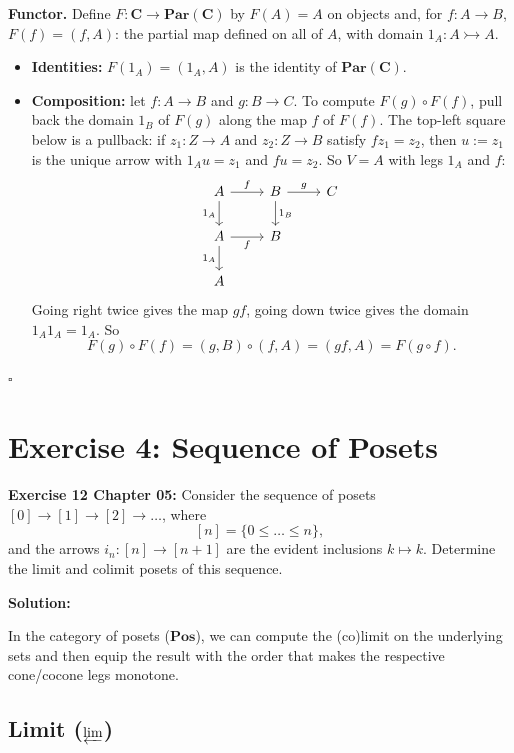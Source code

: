 \documentclass[11pt]{article}
\begin{document}
\textbf{Functor.} Define $F : \mathbf{C} \to \mathbf{Par}(\mathbf{C})$
by $F(A) = A$ on objects and, for $f : A \to B$, $F(f) = (f, A)$: the partial
map defined on all of $A$, with domain $1_A : A \rightarrowtail A$.
\begin{itemize}
  \item \textbf{Identities:} $F(1_A) = (1_A, A)$ is the identity of
    $\mathbf{Par}(\mathbf{C})$.
  \item \textbf{Composition:} let $f : A \to B$ and $g : B \to C$. To compute
    $F(g) \circ F(f)$, pull back the domain $1_B$ of $F(g)$ along the map $f$
    of $F(f)$. The top-left square below is a pullback: if $z_1 : Z \to A$
    and $z_2 : Z \to B$ satisfy $f z_1 = z_2$, then $u := z_1$ is the unique
    arrow with $1_A u = z_1$ and $f u = z_2$. So $V = A$ with legs $1_A$ and
    $f$:
    \[
    \begin{tikzcd}
      A \ar[r, "f"] \ar[d, "1_A"'] & B \ar[r, "g"] \ar[d, "1_B"] & C \\
      A \ar[r, "f"'] \ar[d, "1_A"'] & B & \\
      A & &
    \end{tikzcd}
    \]
    Going right twice gives the map $g f$, going down twice gives the domain
    $1_A 1_A = 1_A$. So
    \[
      F(g) \circ F(f) = (g, B) \circ (f, A) = (g f, A) = F(g \circ f).
    \]
\end{itemize}
\hfill$\square$

\section{Exercise 4: Sequence of Posets}

\textbf{Exercise 12 Chapter 05:} Consider the sequence of posets $[0] \to [1] \to [2] \to \dots$, where 
\[ [n] = \{0 \leq \dots \leq n\}, \]
and the arrows $i_n : [n] \to [n + 1]$ are the evident inclusions $k \mapsto k$. Determine the limit and colimit posets of this sequence.

\vspace{1em}
\noindent\textbf{Solution:}

In the category of posets ($\mathbf{Pos}$), we can compute the (co)limit on the underlying sets and then equip the result with the order that makes the respective cone/cocone legs monotone.

\subsection*{Limit ($\varprojlim$)}
\end{document}
